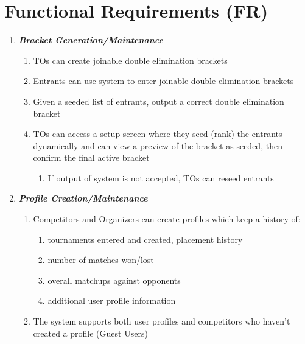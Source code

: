 \documentclass{article}
\begin{document}
\section*{Functional Requirements (FR)}

\begin{enumerate}

    \item \textbf{\textit{Bracket Generation/Maintenance}}
        \begin{enumerate}[label*=\arabic*.]
            \item{{TOs can create joinable double elimination brackets}}\label{1.1}
            \item{{Entrants can use system to enter joinable double elimination brackets}}\label{1.2}
            \item{{Given a seeded list of entrants, output a correct double elimination bracket}}\label{1.3}
            \item{{TOs can access a setup screen where they seed (rank) the entrants dynamically and can view a preview of the bracket as seeded, then confirm the final active bracket}}\label{1.4}
            
                \begin{enumerate}[label*=\arabic*.]
                    \item{If output of system is not accepted, TOs can reseed entrants}
                \end{enumerate}
        \end{enumerate}

    \item \textbf{\textit{Profile Creation/Maintenance}}
        \begin{enumerate}[label*=\arabic*.]
            \item{Competitors and Organizers can create profiles which keep a history of:}\label{2.1}
            \begin{enumerate}[label*=\arabic*.]
                \item{tournaments entered and created, placement history}
                \item{number of matches won/lost}
                \item{overall matchups against opponents}
                \item{additional user profile information}
            \end{enumerate}
            \item{The system supports both user profiles and competitors who haven’t created a profile (Guest Users)}
        \end{enumerate}


\end{enumerate}
\end{document}
